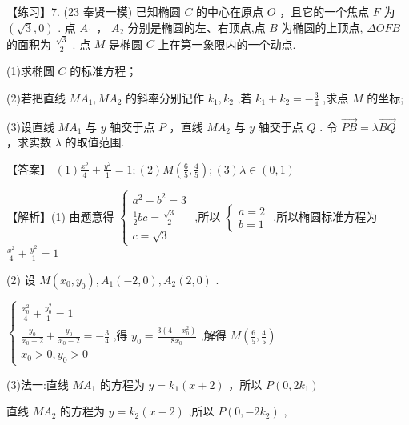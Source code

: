 \documentclass[10pt]{article}
\begin{document}
【练习】7. (23 奉贤一模) 已知椭圆 \(C\) 的中心在原点 \(O\) ，且它的一个焦点 \(F\) 为 \(\left( {\sqrt{3},0}\right)\) . 点 \({A}_{1}\) ， \({A}_{2}\) 分别是椭圆的左、右顶点,点 \(B\) 为椭圆的上顶点, \({\Delta OFB}\) 的面积为 \(\frac{\sqrt{3}}{2}\) . 点 \(M\) 是椭圆 \(C\) 上在第一象限内的一个动点.

(1)求椭圆 \(C\) 的标准方程；

(2)若把直线 \(M{A}_{1},M{A}_{2}\) 的斜率分别记作 \({k}_{1},{k}_{2}\) ,若 \({k}_{1} + {k}_{2} =  - \frac{3}{4}\) ,求点 \(M\) 的坐标;

(3)设直线 \(M{A}_{1}\) 与 \(y\) 轴交于点 \(P\) ，直线 \(M{A}_{2}\) 与 \(y\) 轴交于点 \(Q\) . 令 \(\overrightarrow{PB} = \lambda \overrightarrow{BQ}\) ，求实数 \(\lambda\) 的取值范围.

【答案】 \(\left( 1\right) \frac{{x}^{2}}{4} + \frac{{y}^{2}}{1} = 1;\left( 2\right) M\left( {\frac{6}{5},\frac{4}{5}}\right) ;\left( 3\right) \lambda  \in  \left( {0,1}\right)\)

【解析】(1) 由题意得 \(\left\{  \begin{array}{l} {a}^{2} - {b}^{2} = 3 \\  \frac{1}{2}{bc} = \frac{\sqrt{3}}{2} \\  c = \sqrt{3} \end{array}\right.\) ,所以 \(\left\{  \begin{array}{l} a = 2 \\  b = 1 \end{array}\right.\) ,所以椭圆标准方程为 \(\frac{{x}^{2}}{4} + \frac{{y}^{2}}{1} = 1\)

(2) 设 \(M\left( {{x}_{0},{y}_{0}}\right) ,{A}_{1}\left( {-2,0}\right) ,{A}_{2}\left( {2,0}\right)\) .

\(\left\{  \begin{array}{l} \frac{{x}_{0}^{2}}{4} + \frac{{y}_{0}^{2}}{1} = 1 \\  \frac{{y}_{0}}{{x}_{0} + 2} + \frac{{y}_{0}}{{x}_{0} - 2} =  - \frac{3}{4}\text{ ,得 }{y}_{0} = \frac{3\left( {4 - {x}_{0}^{2}}\right) }{8{x}_{0}}\text{ ,解得 }M\left( {\frac{6}{5},\frac{4}{5}}\right) \\  {x}_{0} > 0,{y}_{0} > 0 \end{array}\right.\)

(3)法一:直线 \(M{A}_{1}\) 的方程为 \(y = {k}_{1}\left( {x + 2}\right)\) ，所以 \(P\left( {0,2{k}_{1}}\right)\)

直线 \(M{A}_{2}\) 的方程为 \(y = {k}_{2}\left( {x - 2}\right)\) ,所以 \(P\left( {0, - 2{k}_{2}}\right)\) ,
\end{document}
